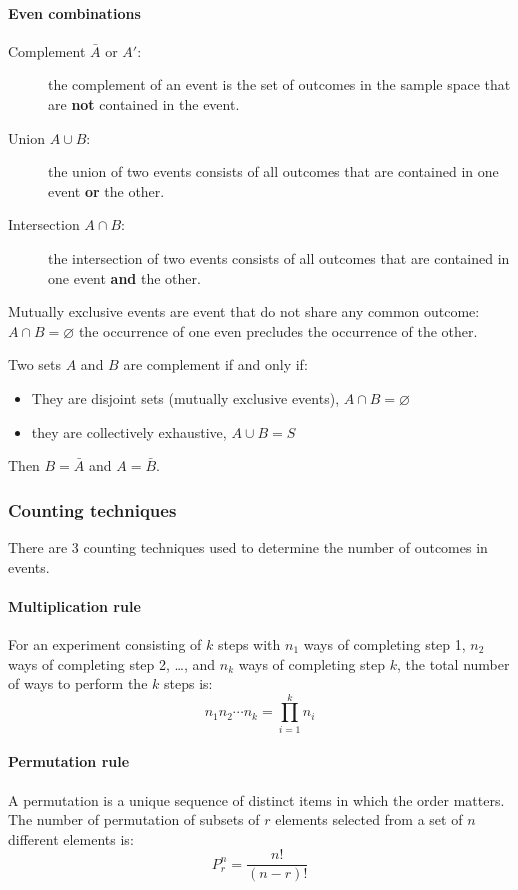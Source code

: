 \documentclass[10pt, twocolumn]{article}
\begin{document}
\paragraph{Even combinations}
\begin{description}
  \item[Complement \(\bar{A}\) or \(A'\):] the complement of an event is the set of outcomes in the sample space that are \textbf{not} contained in the event.
  \item[Union \(A \cup B\):] the union of two events consists of all outcomes that are contained in one event \textbf{or} the other.
  \item[Intersection \(A \cap B\):] the intersection of two events consists of all outcomes that are contained in one event \textbf{and} the other.
\end{description}

Mutually exclusive events are event that do not share any common outcome: \(A \cap B = \varnothing\) the occurrence of one even precludes the occurrence of the other.

Two sets \(A\) and \(B\) are complement if and only if:
\begin{itemize}
  \item They are disjoint sets (mutually exclusive events), \(A \cap B = \varnothing\)
  \item they are collectively exhaustive, \(A \cup B = S\)
\end{itemize}
Then \(B = \bar{A}\) and \(A = \bar{B}\).


\subsubsection{Counting techniques}
There are 3 counting techniques used to determine the number of outcomes in events.


\paragraph{Multiplication rule}
For an experiment consisting of \(k\) steps with \(n_1\) ways of completing step 1, \(n_2\) ways of completing step 2, \dots, and \(n_k\) ways of completing step \(k\), the total number of ways to perform the \(k\) steps is:
\[
  n_1 n_2 \cdots n_k = \prod_{i = 1}^k{n_i}
\]


\paragraph{Permutation rule}
A permutation is a unique sequence of distinct items in which the order matters.
The number of permutation of subsets of \(r\) elements selected from a set of \(n\) different elements is:
\[
  P_r^n = \frac{n!}{(n - r)!}
\]
\end{document}
